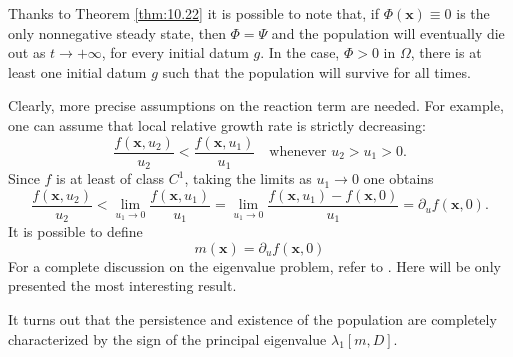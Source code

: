 Thanks to Theorem \ref{thm:10.22} it is possible to note that, if \(\Phi(\bm{x}) \equiv 0\) is the only nonnegative steady state, then \(\Phi = \Psi\) and the population will eventually die out as \(t \to +\infty\), for every initial datum \(g\). In the case, \(\Phi > 0\) in \(\Omega\), there is at least one initial datum \(g\) such that the population will survive for all times. 

Clearly, more precise assumptions on the reaction term are needed. For example, one can assume that local relative growth rate is strictly decreasing:
\begin{equation}
    \frac{f(\bm{x}, u_2)}{u_2} < \frac{f(\bm{x}, u_1)}{u_1} \quad \text{whenever } u_2 > u_1 > 0.
    \label{eq:10.69}
\end{equation}
Since \(f\) is at least of class \(C^1\), taking the limits as \(u_1 \to 0\) one obtains
\[
    \frac{f(\bm{x}, u_2)}{u_2} < \lim_{u_1 \to 0} \frac{f(\bm{x}, u_1)}{u_1} = \lim_{u_1 \to 0} \frac{f(\bm{x}, u_1) - f(\bm{x}, 0)}{u_1} = \partial_u f(\bm{x}, 0).
\]
It is possible to define 
\begin{equation}
    m(\bm{x}) = \partial_u f(\bm{x}, 0)
\end{equation}
For a complete discussion on the eigenvalue problem, refer to \cite{SalsaVerziniPDE}. Here will be only presented the most interesting result.

It turns out that the persistence and existence of the population are completely characterized by the sign of the principal eigenvalue \(\lambda_1[m, D]\).